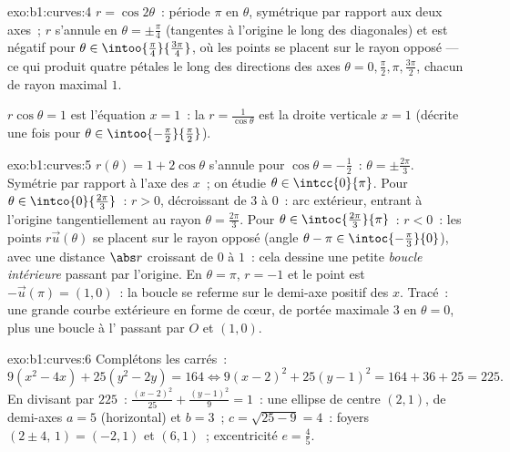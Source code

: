 \begin{solution}{exo:b1:curves:4}
$r = \cos 2\theta$~: période $\pi$ en $\theta$, symétrique par rapport aux deux
axes~; $r$ s'annule en $\theta = \pm\frac\pi4$ (tangentes à
l'origine le long des diagonales) et est négatif pour $\theta \in
\intoo{\frac\pi4}{\frac{3\pi}{4}}$, où les points se placent sur le
rayon opposé --- ce qui produit quatre pétales le long des directions des axes
$\theta = 0, \frac\pi2, \pi, \frac{3\pi}{2}$, chacun de rayon
maximal $1$.

$r\cos\theta = 1$ est l'équation $x = 1$~: la  $r =
\frac{1}{\cos\theta}$ est la droite verticale $x = 1$ (décrite une fois pour
$\theta \in \intoo{-\frac\pi2}{\frac\pi2}$).
\end{solution}

\begin{solution}{exo:b1:curves:5}
$r(\theta) = 1 + 2\cos\theta$ s'annule pour $\cos\theta = -\frac12$~:
$\theta = \pm\frac{2\pi}{3}$. Symétrie par rapport à l'axe des $x$~; on étudie
$\theta \in \intcc{0}{\pi}$. Pour $\theta \in
\intco{0}{\frac{2\pi}{3}}$~: $r > 0$, décroissant de $3$ à $0$~:
arc extérieur, entrant à l'origine tangentiellement au rayon $\theta =
\frac{2\pi}{3}$. Pour $\theta \in \intoc{\frac{2\pi}{3}}{\pi}$~: $r <
0$~: les points $r\vec u(\theta)$ se placent sur le rayon opposé (angle
$\theta - \pi \in \intoc{-\frac\pi3}{0}$), avec une distance $\abs r$
croissant de $0$ à $1$~: cela dessine une petite \emph{boucle intérieure}
passant par l'origine. En $\theta = \pi$, $r = -1$ et le point est
$-\vec u(\pi) = (1, 0)$~: la boucle se referme sur le demi-axe positif des $x$.
Tracé~: une grande courbe extérieure en forme de cœur,
de portée maximale $3$ en $\theta = 0$, plus une boucle à l'
passant par $O$ et $(1,0)$.
\end{solution}

\begin{solution}{exo:b1:curves:6}
Complétons les carrés~:
\[
9(x^2 - 4x) + 25(y^2 - 2y) = 164
\iff 9(x-2)^2 + 25(y-1)^2 = 164 + 36 + 25 = 225 .
\]
En divisant par $225$~: $\frac{(x-2)^2}{25} + \frac{(y-1)^2}{9} = 1$~: une
ellipse de centre $(2, 1)$, de demi-axes $a = 5$ (horizontal) et $b =
3$~; $c = \sqrt{25 - 9} = 4$~: foyers $(2 \pm 4,\, 1) = (-2, 1)$ et
$(6, 1)$~; excentricité $e = \frac45$.
\end{solution}

